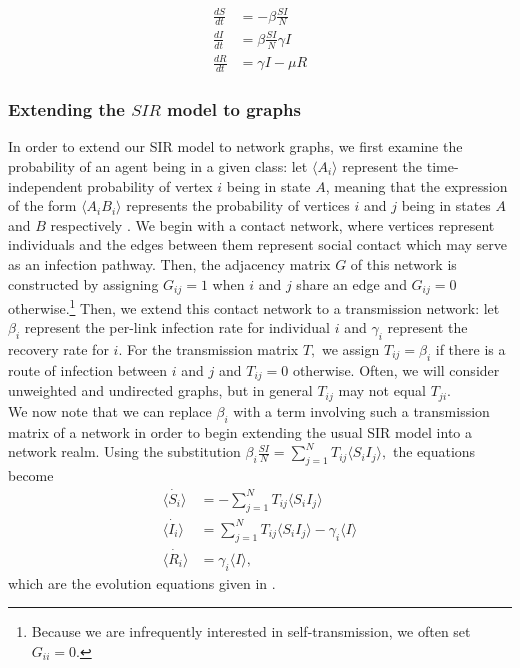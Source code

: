 \documentclass[../report.tex]{subfiles}
\begin{document}
\begin{align}
\frac{dS}{dt} & = -\beta \frac{SI}{N} \label{dS}\\
\frac{dI}{dt} & = \beta\frac{SI}{N} \gamma I \label{dI}\\
\frac{dR}{dt} & = \gamma I - \mu R \label{dR}
\end{align}


\subsubsection{Extending the $SIR$ model to graphs}

In order to extend our SIR model to network graphs, we first examine the probability of an agent being in a given class: let $\langle A_i \rangle$ represent the time-independent probability of vertex $i$ being in state $A$, meaning that the expression of the form $\langle A_i B_i \rangle$ represents the probability of vertices $i$ and $j$ being in states $A$ and $B$ respectively \cite{kiss_2014}. We begin with a contact network, where vertices represent individuals and the edges between them represent social contact which may serve as an infection pathway. Then, the adjacency matrix $G$ of this network is constructed by assigning $G_{ij} = 1$ when $i$ and $j$ share an edge and $G_{ij} = 0$ otherwise.\footnote{Because we are infrequently interested in self-transmission, we often set $G_{ii}=0.$} Then, we extend this contact network to a transmission network: let $\beta_i$ represent the per-link infection rate for individual $i$ and $\gamma_i$ represent the recovery rate for $i$. For the transmission matrix $T,$ we assign $T_{ij}=\beta_i$ if there is a route of infection between $i$ and $j$ and $T_{ij}=0$ otherwise. Often, we will consider unweighted and undirected graphs, but in general $T_{ij}$ may not equal $T_{ji}$.\\
We now note that we can replace $\beta_i$ with a term involving such a transmission matrix of a network in order to begin extending the usual SIR model into a network realm. Using the substitution $ \beta_i \frac{SI}{N} = \sum^{N}_{j=1}T_{ij} \langle S_i I_j \rangle,$ the equations become
\begin{align*}
\dot{\langle S_i \rangle} & = -\sum^{N}_{j=1}T_{ij} \langle S_i I_j \rangle\\
\dot{\langle I_i \rangle} & =\sum^{N}_{j=1}T_{ij}\langle S_i I_j \rangle - \gamma_i \langle I \rangle \\
\dot{\langle R_i \rangle} & = \gamma_i \langle I \rangle,
\end{align*}
which are the evolution equations given in \cite{kiss_2014}.
\end{document}
